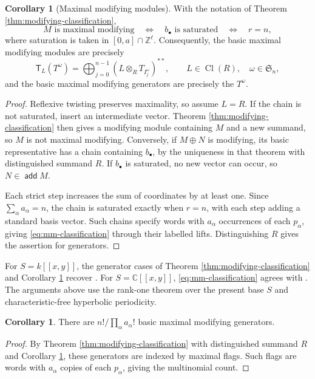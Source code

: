\documentclass[a4paper,reqno]{amsart}
\DeclareMathOperator{\add}{\mathsf{add}}
\DeclareMathOperator{\Cl}{Cl}
\theoremstyle{definition}
\newtheorem{Cor}[Thm]{Corollary}
\begin{document}
\begin{Cor}[Maximal modifying modules]\label{cor:mm-classification}
With the notation of Theorem \ref{thm:modifying-classification},
\[
M\text{ is maximal modifying}
\quad\Longleftrightarrow\quad
b_\bullet\text{ is saturated}
\quad\Longleftrightarrow\quad r=n,
\]
where saturation is taken in $[0,a]\cap\mathbb Z^\ell$. Consequently, the basic maximal modifying modules are precisely
\begin{equation}\label{eq:mm-classification}
\mathsf T_L(T^\omega)
=\bigoplus_{j=0}^{n-1}(L\otimes_RT_{I_j^\omega})^{**},
\qquad L\in\Cl(R),\quad\omega\in\mathfrak S_n,
\end{equation}
and the basic maximal modifying generators are precisely the $T^\omega$.
\end{Cor}
\begin{proof}
Reflexive twisting preserves maximality, so assume $L=R$. If the chain is not saturated, insert an intermediate vector. Theorem \ref{thm:modifying-classification} then gives a modifying module containing $M$ and a new summand, so $M$ is not maximal modifying. Conversely, if $M\oplus N$ is modifying, its basic representative has a chain containing $b_\bullet$, by the uniqueness in that theorem with distinguished summand $R$. If $b_\bullet$ is saturated, no new vector can occur, so $N\in\add M$.

Each strict step increases the sum of coordinates by at least one. Since $\sum_\alpha a_\alpha=n$, the chain is saturated exactly when $r=n$, with each step adding a standard basis vector. Such chains specify words with $a_\alpha$ occurrences of each $p_\alpha$, giving \eqref{eq:mm-classification} through their labelled lifts. Distinguishing $R$ gives the assertion for generators.
\end{proof}

For $S=k[[x,y]]$, the generator cases of Theorem \ref{thm:modifying-classification} and Corollary \ref{cor:mm-classification} recover \cite[Theorem 5.1(1), (2)]{IW18}. For $S=\mathbb C[[x,y]]$, \eqref{eq:mm-classification} agrees with \cite[Theorem 5.20]{IW18}. The arguments above use the rank-one theorem over the present base $S$ and characteristic-free hyperbolic periodicity.

\begin{Cor}\label{cor:mm-counts}
There are $n!/\prod_\alpha a_\alpha!$ basic maximal modifying generators.
\end{Cor}
\begin{proof}
By Theorem \ref{thm:modifying-classification} with distinguished summand $R$ and Corollary \ref{cor:mm-classification}, these generators are indexed by maximal flags. Such flags are words with $a_\alpha$ copies of each $p_\alpha$, giving the multinomial count.
\end{proof}
\end{document}
